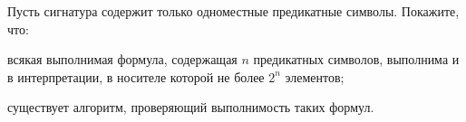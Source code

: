 Пусть сигнатура содержит только одноместные предикатные символы. Покажите, что:
\begin{enumcyr}
    \item всякая выполнимая формула, содержащая $n$ предикатных символов, выполнима и в интерпретации, в носителе которой не
    	более $2^n$ элементов;
    \item существует алгоритм, проверяющий выполнимость таких формул.
\end{enumcyr}